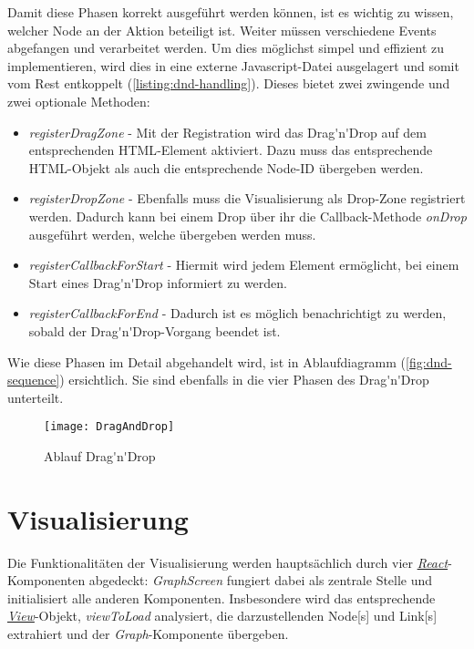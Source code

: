 Damit diese Phasen korrekt ausgeführt werden können, ist es wichtig zu wissen, welcher \gls{Node} an der Aktion beteiligt ist. Weiter müssen verschiedene \gls{Event}s abgefangen und verarbeitet werden. Um dies möglichst simpel und effizient zu implementieren, wird dies in eine externe \gls{Javascript}-Datei ausgelagert und somit vom Rest entkoppelt (\autoref{listing:dnd-handling}). Dieses bietet zwei zwingende und zwei optionale Methoden:
\begin{itemize}
    \item \textit{registerDragZone} - Mit der Registration wird das \gls{Drag'n'Drop} auf dem entsprechenden \gls{HTML}-Element aktiviert. Dazu muss das entsprechende \gls{HTML}-Objekt als auch die entsprechende Node-ID übergeben werden.
    \item \textit{registerDropZone} - Ebenfalls muss die Visualisierung als Drop-Zone registriert werden. Dadurch kann bei einem Drop über ihr die \gls{Callback}-Methode \textit{onDrop} ausgeführt werden, welche übergeben werden muss. 
    \item \textit{registerCallbackForStart} - Hiermit wird jedem Element ermöglicht, bei einem Start eines \gls{Drag'n'Drop} informiert zu werden. 
    \item \textit{registerCallbackForEnd} - Dadurch ist es möglich benachrichtigt zu werden, sobald der \gls{Drag'n'Drop}-Vorgang beendet ist.
\end{itemize}


Wie diese Phasen im Detail abgehandelt wird, ist in Ablaufdiagramm (\autoref{fig:dnd-sequence}) ersichtlich. Sie sind ebenfalls in die vier Phasen des \gls{Drag'n'Drop} unterteilt.

\begin{figure}[htbp]
\centerline{\texttt{[image: DragAndDrop]}}
\caption{Ablauf \gls{Drag'n'Drop}}
\label{fig:dnd-sequence}
\end{figure}

\section{Visualisierung}\label{visual}
Die Funktionalitäten der Visualisierung werden hauptsächlich durch vier \hyperref[react]{\textit{React}}-Komponenten abgedeckt: \textit{GraphScreen} fungiert dabei als zentrale Stelle und initialisiert alle anderen Komponenten. Insbesondere wird das entsprechende \hyperref[view]{\textit{View}}-Objekt, \textit{viewToLoad} analysiert, die darzustellenden \gls{Node}[s] und \gls{Link}[s] extrahiert und der \textit{Graph}-Komp\-on\-en\-te übergeben.

